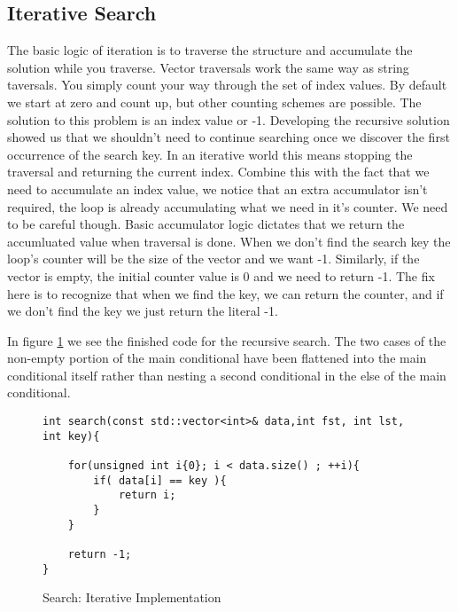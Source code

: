\documentclass[]{tufte-handout}
\begin{document}
\subsection{Iterative Search}

The basic logic of iteration is to traverse the structure and accumulate the solution while you traverse. Vector traversals work the same way as string taversals. You simply count your way through the set of index values\sidenote{[0,size)}. By default we start at zero and count up, but other counting schemes are possible. The solution to this problem is an index value or -1.  Developing the recursive solution showed us that we shouldn't need to continue searching once we discover the first occurrence of the search key. In an iterative world this means stopping the traversal and returning the current index. Combine this with the fact that we need to accumulate an index value, we notice that an extra accumulator isn't required, the loop is already accumulating what we need in it's counter. We need to be careful though. Basic accumulator logic dictates that we return the accumluated value when traversal is done.  When we don't find the search key the loop's counter will be the size of the vector and we want -1. Similarly, if the vector is empty, the initial counter value is 0 and we need to return -1. The fix here is to recognize that when we find the key, we can return the counter, and if we don't find the key we just return the literal -1. 

In figure \ref{code:searchiter} we see the finished code for the recursive search. The two cases of the non-empty portion of the main conditional have been flattened into the main conditional itself rather than nesting a second conditional in the else of the main conditional. 
\begin{figure}[htpb!]
\begin{lstlisting}
int search(const std::vector<int>& data,int fst, int lst, int key){

    for(unsigned int i{0}; i < data.size() ; ++i){
    	if( data[i] == key ){
			return i;
		}
    }

    return -1;
}
\end{lstlisting}
\label{code:searchiter}
\caption{Search: Iterative Implementation}
\end{figure}
\end{document}
